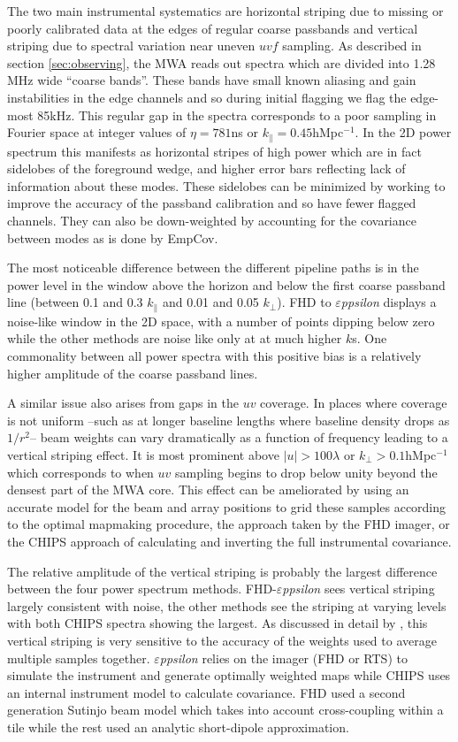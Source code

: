 \documentclass[twolcolumn,iop]{emulateapj}
\def\eppsilon{{\it $\varepsilon$ppsilon}}
\def\empirical{EmpCov}
\begin{document}
The two main instrumental systematics are horizontal striping due to missing or poorly calibrated data at the edges of regular coarse passbands and vertical striping due to spectral variation near uneven $uvf$ sampling. As described in section \ref{sec:observing}, the MWA reads out spectra which are divided into 1.28\,MHz wide ``coarse bands''. These bands have small known aliasing and gain instabilities in the edge channels and so during initial flagging we flag the edge-most 85kHz.  This regular gap in the spectra corresponds to a poor sampling in Fourier space at integer values of $\eta=781$ns or $k_\parallel=0.45$hMpc$^{-1}$.  In the 2D power spectrum this manifests as horizontal stripes of high power which are in fact sidelobes of the foreground wedge, and higher error bars reflecting lack of information about these modes.  These sidelobes can be minimized by working to improve the accuracy of the passband calibration and so have fewer flagged channels. They can also be down-weighted by accounting for the covariance between modes as is done by \empirical{}. 

The most noticeable difference between the different pipeline paths is in the power level in the window above the horizon and below the first coarse passband line (between 0.1 and 0.3 $k_\parallel$ and 0.01 and 0.05 $k_\perp$). FHD to \eppsilon{} displays a noise-like window in the 2D space, with a number of points dipping below zero while the other methods are noise like only at at much higher $k$s.  One commonality between all power spectra with this positive bias is a relatively higher amplitude of the coarse passband lines. 


 A similar issue also arises from gaps in the $uv$ coverage. In places where coverage is not uniform --such as at longer baseline lengths where baseline density drops as $1/r^2$-- beam weights can vary dramatically as a function of frequency leading to a vertical striping effect. It is most prominent above $|u|>100\lambda$ or $k_\perp>0.1$hMpc$^{-1}$ which corresponds to when $uv$ sampling begins to drop below unity beyond the densest part of the MWA core. This effect can be ameliorated by using an accurate model for the beam and array positions to grid these samples according to the optimal mapmaking procedure, the approach taken by the FHD imager, or the CHIPS approach of calculating and inverting the full instrumental covariance. 
 
The relative amplitude of the vertical striping is probably the largest difference between the four power spectrum methods.   FHD-\eppsilon{} sees vertical striping largely consistent with noise, the other methods see the striping at varying levels with both CHIPS spectra showing the largest.  As discussed in detail by \cite{Morales:2012p8790}, this vertical striping is very sensitive to the accuracy of the weights used to average multiple samples together.  \eppsilon{} relies on the imager (FHD or RTS) to simulate the instrument and generate optimally weighted maps while CHIPS uses an internal instrument model to calculate covariance. FHD used a second generation Sutinjo beam model which takes into account cross-coupling within a tile while the rest used an analytic short-dipole approximation.
\end{document}
